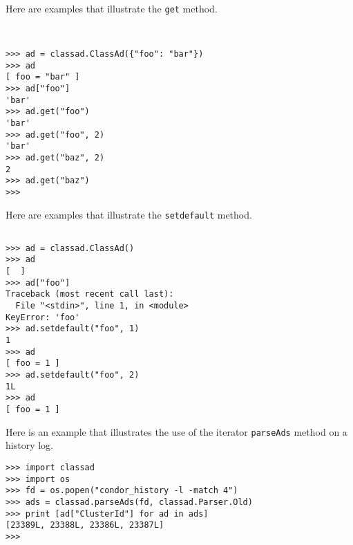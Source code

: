 Here are examples that illustrate the \texttt{get} method.
\footnotesize
\begin{verbatim}


>>> ad = classad.ClassAd({"foo": "bar"})
>>> ad
[ foo = "bar" ]
>>> ad["foo"]
'bar'
>>> ad.get("foo")
'bar'
>>> ad.get("foo", 2)
'bar'
>>> ad.get("baz", 2)
2
>>> ad.get("baz")
>>>

\end{verbatim}
\normalsize


Here are examples that illustrate the \texttt{setdefault} method.
\footnotesize
\begin{verbatim}

>>> ad = classad.ClassAd()
>>> ad
[  ]
>>> ad["foo"]
Traceback (most recent call last):
  File "<stdin>", line 1, in <module>
KeyError: 'foo'
>>> ad.setdefault("foo", 1)
1
>>> ad
[ foo = 1 ]
>>> ad.setdefault("foo", 2)
1L
>>> ad
[ foo = 1 ]

\end{verbatim}
\normalsize

Here is an example that illustrates the use of the iterator
\texttt{parseAds} method on a history log.
\footnotesize
\begin{verbatim}
>>> import classad
>>> import os
>>> fd = os.popen("condor_history -l -match 4")
>>> ads = classad.parseAds(fd, classad.Parser.Old)
>>> print [ad["ClusterId"] for ad in ads]
[23389L, 23388L, 23386L, 23387L]
>>>
\end{verbatim}
\normalsize
